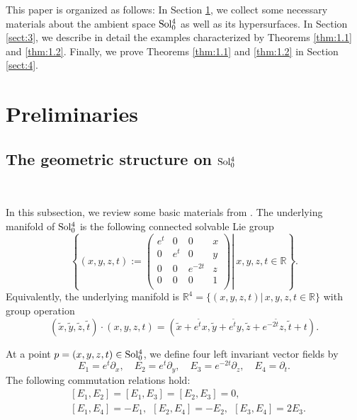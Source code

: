 \documentclass[reqno]{amsart}%
\theoremstyle{definition}
\numberwithin{equation}{section}
\begin{document}
	This paper is organized as follows: In Section \ref{sect:2}, we collect some necessary
	materials about the ambient space ${\rm Sol_0^4}$ as well as its hypersurfaces.
	In Section \ref{sect:3}, we describe in detail the examples characterized by 
	Theorems \ref{thm:1.1} and \ref{thm:1.2}.
	Finally, we prove Theorems \ref{thm:1.1} and \ref{thm:1.2} in Section \ref{sect:4}.
	
	
	\section{Preliminaries}\label{sect:2}
	\subsection{The geometric structure on \texorpdfstring{${\rm Sol_0^4}$}{Sol40}}\label{sect:2.1}~
	
	In this subsection, we review some basic materials from \cite{DIV,EI2}.
	The underlying manifold of ${\rm Sol_0^4}$ is the following
	connected solvable Lie group
	\begin{equation}\label{eqn:12.88}
		\left\{
		(x, y, z, t):=
		\left.\left(
		\begin{matrix}
			e^t & 0   & 0       & x \\
			0   & e^t & 0       & y \\
			0   & 0   & e^{-2t} & z \\
			0   & 0   & 0       & 1 \\
		\end{matrix}
		\right) \right| \ x,y,z,t\in \mathbb{R}
		\right\}.
	\end{equation}
	Equivalently, the underlying manifold is
	$\mathbb{R}^4=\{(x,y,z,t)|\, x,y,z,t\in \mathbb{R}\}$ with group operation
	\begin{equation}\label{eqn:2.1}
		(\tilde{x},\tilde{y},\tilde{z},\tilde{t})\cdot(x,y,z,t)
		=(\tilde{x}+e^{\tilde{t}}x,\tilde{y}+e^{\tilde{t}}y,\tilde{z}+e^{-2\tilde{t}}z,\tilde{t}+t).
	\end{equation}
	
	At a point $p=(x,y,z,t)\in {\rm Sol_0^4}$, we define four left invariant vector fields by
	\begin{equation}\label{eqn:2.2}
		E_1=e^t \partial_x, \quad
		E_2=e^t \partial_y,\quad
		E_3=e^{-2t} \partial_z, \quad
		E_4= \partial_t.
	\end{equation}
	The following commutation relations hold:
	\begin{equation}\label{eqn:2.3}
		\begin{aligned}
			&[E_1,E_2]=[E_1,E_3]=[E_2,E_3]=0,\\
			&[E_1,E_4]=-E_1, \ \ [E_2,E_4]=-E_2, \ \ [E_3,E_4]=2E_3.
		\end{aligned}
	\end{equation}
	
\end{document}

